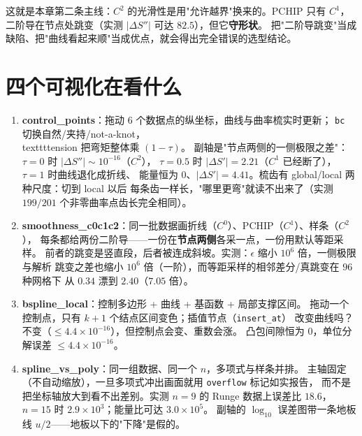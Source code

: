 \begin{remark}
这就是本章第二条主线：$C^2$ 的光滑性是用"允许越界"换来的。PCHIP 只有 $C^1$，
二阶导在节点处跳变（实测 $|\Delta S''|$ 可达 $82.5$），但它\textbf{守形状}。
把"二阶导跳变"当成缺陷、把"曲线看起来顺"当成优点，就会得出完全错误的选型结论。
\end{remark}

\section{四个可视化在看什么}

\begin{enumerate}
  \item \textbf{control\_points}：拖动 $6$ 个数据点的纵坐标，曲线与曲率梳实时更新；
        \texttt{bc} 切换自然/夹持/not-a-knot，\\texttt{tension} 把弯矩整体乘 $(1-\tau)$。
        副轴是"节点两侧的一侧极限之差"：$\tau=0$ 时 $|\Delta S''|\sim10^{-16}$（$C^2$），
        $\tau=0.5$ 时 $|\Delta S'|=2.21$（$C^1$ 已经断了），$\tau=1$ 时曲线退化成折线、
        能量恒为 $0$、$|\Delta S'|=4.41$。梳齿有 global/local 两种尺度：切到 local 以后
        每条齿一样长，"哪里更弯"就读不出来了（实测 $199/201$ 个非零曲率点齿长完全相同）。
  \item \textbf{smoothness\_c0c1c2}：同一批数据画折线（$C^0$）、PCHIP（$C^1$）、样条（$C^2$），
        每条都给两份二阶导——一份在\textbf{节点两侧}各采一点，一份用默认等距采样。
        前者的跳变是竖直段，后者被连成斜坡。实测：$\epsilon$ 缩小 $10^6$ 倍，一侧极限与解析
        跳变之差也缩小 $10^6$ 倍（一阶），而等距采样的相邻差分/真跳变在 $96$ 种网格下
        从 $0.34$ 漂到 $2.40$（$7.05$ 倍）。
  \item \textbf{bspline\_local}：控制多边形 + 曲线 + 基函数 + 局部支撑区间。
        拖动一个控制点，只有 $k+1$ 个结点区间变色；插值节点（\texttt{insert\_at}）
        改变曲线吗？不变（$\le4.4\times10^{-16}$），但控制点会变、重数会涨。
        凸包间隙恒为 $0$，单位分解误差 $\le4.4\times10^{-16}$。
  \item \textbf{spline\_vs\_poly}：同一组数据、同一个 $n$，多项式与样条并排。
        主轴固定（不自动缩放），一旦多项式冲出画面就用 \texttt{overflow} 标记如实报告，
        而不是把坐标轴放大到看不出差别。实测 $n=9$ 的 Runge 数据上误差比 $18.6$，
        $n=15$ 时 $2.9\times10^3$；能量比可达 $3.0\times10^5$。
        副轴的 $\log_{10}$ 误差图带一条地板线 $u/2$——地板以下的"下降"是假的。
\end{enumerate}



